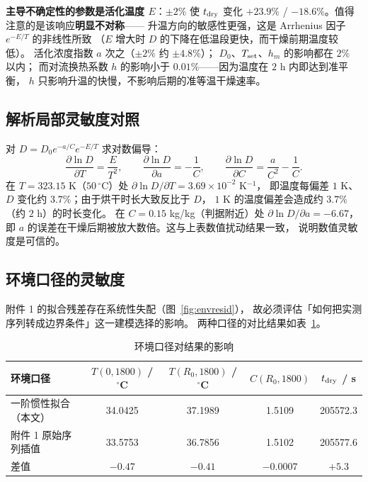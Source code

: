 \documentclass[withoutpreface,bwprint]{cumcmthesis}
\begin{document}
\textbf{主导不确定性的参数是活化温度 $E$}：$\pm2\%$ 使 $t_{\rm dry}$ 变化
$+23.9\%$ / $-18.6\%$。值得注意的是该响应\textbf{明显不对称}——
升温方向的敏感性更强，这是 Arrhenius 因子 $e^{-E/T}$ 的非线性所致
（$E$ 增大时 $D$ 的下降在低温段更快，而干燥前期温度较低）。
活化浓度指数 $a$ 次之（$\pm2\%$ 约 $\pm4.8\%$）；
$D_0$、$T_{\rm set}$、$h_m$ 的影响都在 $2\%$ 以内；
而对流换热系数 $h$ 的影响小于 $0.01\%$——因为温度在 $2$ h 内即达到准平衡，
$h$ 只影响升温的快慢，不影响后期的准等温干燥速率。

\subsection{解析局部灵敏度对照}

对 $D=D_0e^{-a/C}e^{-E/T}$ 求对数偏导：
\begin{equation}
\frac{\partial\ln D}{\partial T}=\frac{E}{T^2},\qquad
\frac{\partial\ln D}{\partial a}=-\frac{1}{C},\qquad
\frac{\partial\ln D}{\partial C}=\frac{a}{C^2}-\frac{1}{C}.
\end{equation}
在 $T=323.15$ K（$50\,^\circ$C）处 $\partial\ln D/\partial T=3.69\times10^{-2}$ K$^{-1}$，
即温度每偏差 $1$ K、$D$ 变化约 $3.7\%$；由于烘干时长大致反比于 $D$，
$1$ K 的温度偏差会造成约 $3.7\%$（约 $2$ h）的时长变化。
在 $C=0.15$ kg/kg（判据附近）处 $\partial\ln D/\partial a=-6.67$，
即 $a$ 的误差在干燥后期被放大数倍。这与上表数值扰动结果一致，
说明数值灵敏度是可信的。

\subsection{环境口径的灵敏度}

附件 1 的拟合残差存在系统性失配（图~\ref{fig:envresid}），
故必须评估「如何把实测序列转成边界条件」这一建模选择的影响。
两种口径的对比结果如表~\ref{tab:ambient}。

\begin{table}[H]
\centering
\small
\caption{环境口径对结果的影响}
\label{tab:ambient}
\begin{tabular}{@{}lcccc@{}}
\toprule
环境口径 & $T(0,1800)$ / $^\circ$C & $T(R_0,1800)$ / $^\circ$C & $C(R_0,1800)$ & $t_{\rm dry}$ / s \\
\midrule
一阶惯性拟合（本文） & 34.0425 & 37.1989 & 1.5109 & 205572.3 \\
附件 1 原始序列插值 & 33.5753 & 36.7856 & 1.5102 & 205577.6 \\
\midrule
差值 & $-0.47$ & $-0.41$ & $-0.0007$ & $+5.3$ \\
\bottomrule
\end{tabular}
\end{table}
\end{document}
